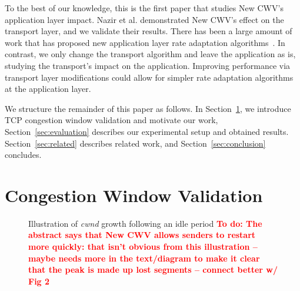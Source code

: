 \documentclass[10pt,sigconf,anonymous]{acmart}
\newcommand{\todo}[1]{\textbf{\textcolor{red}{To do: #1}}}
\begin{document}
To the best of our knowledge, this is the first paper that studies New CWV's application layer impact. Nazir et al. \cite{Nazir-2014-performance-evaluation-congestion-window-validation-dash-newcwv} demonstrated New CWV's effect on the transport layer, and we validate their results. There has been a large amount of work that has proposed new application layer rate adaptation algorithms~\cite{Mok-2012-qdash,Huang-2015-A-buffer-based-approach-to-rate-adaptation-bba, Yin-2015-a-control-theoritic-approach}. In contrast, we only change the transport algorithm and leave the application as is, studying the transport's impact on the application. Improving performance via transport layer modifications could allow for simpler rate adaptation algorithms at the application layer. %


We structure the remainder of this paper as follows. In Section~\ref{sec:background}, we introduce TCP congestion window validation and motivate our work, Section~\ref{sec:evaluation} describes our experimental setup and obtained results. Section~\ref{sec:related} describes related work, and Section~\ref{sec:conclusion} concludes.

\section{Congestion Window Validation}
\label{sec:background}

\begin{figure}
  \centering
    \caption{Illustration of \emph{cwnd} growth following an idle period \todo{The abstract says that New CWV allows senders to restart more quickly: that isn't obvious from this illustration -- maybe needs more in the text/diagram to make it clear that the peak is made up lost segments -- connect better w/ Fig 2}}
    \label{fig:cwnd-growth-after-idle}
\end{figure}
\end{document}
